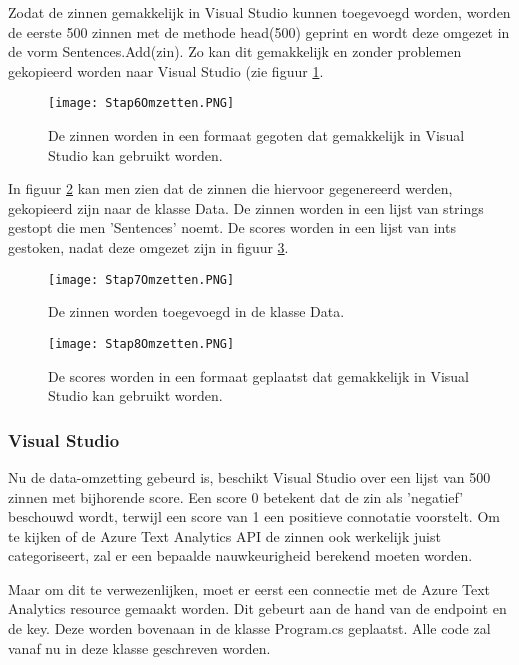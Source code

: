 Zodat de zinnen gemakkelijk in Visual Studio kunnen toegevoegd worden, worden de eerste 500 zinnen met de methode head(500) geprint en wordt deze omgezet in de vorm Sentences.Add(zin). Zo kan dit gemakkelijk en zonder problemen gekopieerd worden naar Visual Studio (zie figuur \ref{stap6amazon}.

\begin{figure}[!htbp]
    \texttt{[image: Stap6Omzetten.PNG]}
    \caption{\label{stap6amazon}De zinnen worden in een formaat gegoten dat gemakkelijk in Visual Studio kan gebruikt worden.}
\end{figure}
\FloatBarrier

In figuur \ref{stap7amazon} kan men zien dat de zinnen die hiervoor gegenereerd werden, gekopieerd zijn naar de klasse Data. De zinnen worden in een lijst van \gls{string}s gestopt die men 'Sentences' noemt. De scores worden in een lijst van \gls{int}s gestoken, nadat deze omgezet zijn in figuur \ref{stap8amazon}.

\begin{figure}[!htbp]
    \texttt{[image: Stap7Omzetten.PNG]}
    \caption{\label{stap7amazon}De zinnen worden toegevoegd in de klasse Data.}
\end{figure}
\FloatBarrier

\begin{figure}[!htbp]
    \texttt{[image: Stap8Omzetten.PNG]}
    \caption{\label{stap8amazon}De scores worden in een formaat geplaatst dat gemakkelijk in Visual Studio kan gebruikt worden.}
\end{figure}
\FloatBarrier


\subsubsection{Visual Studio}
\label{amazondatasetvisualstudioazure}
Nu de data-omzetting gebeurd is, beschikt Visual Studio over een lijst van 500 zinnen met bijhorende score. Een score 0 betekent dat de zin als 'negatief' beschouwd wordt, terwijl een score van 1 een positieve connotatie voorstelt. Om te kijken of de Azure Text Analytics API de zinnen ook werkelijk juist categoriseert, zal er een bepaalde nauwkeurigheid berekend moeten worden. 

Maar om dit te verwezenlijken, moet er eerst een connectie met de Azure Text Analytics resource gemaakt worden. Dit gebeurt aan de hand van de endpoint en de key. Deze worden bovenaan in de klasse Program.cs geplaatst. Alle code zal vanaf nu in deze klasse geschreven worden. 

